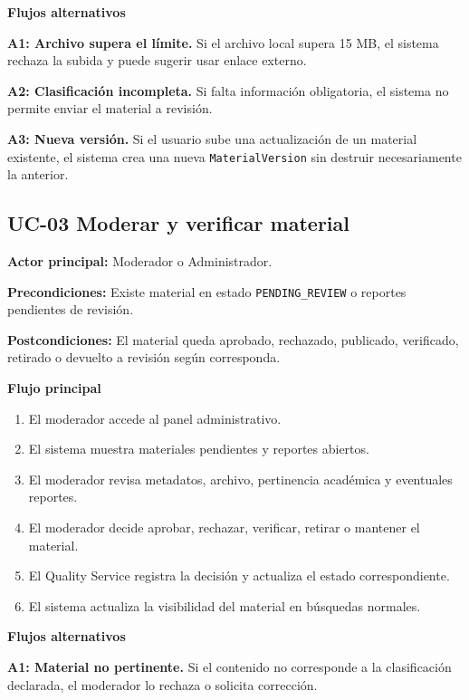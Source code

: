 \documentclass[12pt,a4paper]{article}
\begin{document}
\noindent\textbf{Flujos alternativos}

\noindent\textbf{A1: Archivo supera el límite.} Si el archivo local supera 15 MB, el sistema rechaza la subida y puede sugerir usar enlace externo.

\noindent\textbf{A2: Clasificación incompleta.} Si falta información obligatoria, el sistema no permite enviar el material a revisión.

\noindent\textbf{A3: Nueva versión.} Si el usuario sube una actualización de un material existente, el sistema crea una nueva \texttt{MaterialVersion} sin destruir necesariamente la anterior.

\subsection{UC-03 Moderar y verificar material}

\noindent\textbf{Actor principal:} Moderador o Administrador.

\noindent\textbf{Precondiciones:} Existe material en estado \texttt{PENDING\_REVIEW} o reportes pendientes de revisión.

\noindent\textbf{Postcondiciones:} El material queda aprobado, rechazado, publicado, verificado, retirado o devuelto a revisión según corresponda.

\noindent\textbf{Flujo principal}

\begin{enumerate}
    \item El moderador accede al panel administrativo.
    \item El sistema muestra materiales pendientes y reportes abiertos.
    \item El moderador revisa metadatos, archivo, pertinencia académica y eventuales reportes.
    \item El moderador decide aprobar, rechazar, verificar, retirar o mantener el material.
    \item El Quality Service registra la decisión y actualiza el estado correspondiente.
    \item El sistema actualiza la visibilidad del material en búsquedas normales.
\end{enumerate}

\noindent\textbf{Flujos alternativos}

\noindent\textbf{A1: Material no pertinente.} Si el contenido no corresponde a la clasificación declarada, el moderador lo rechaza o solicita corrección.
\end{document}
